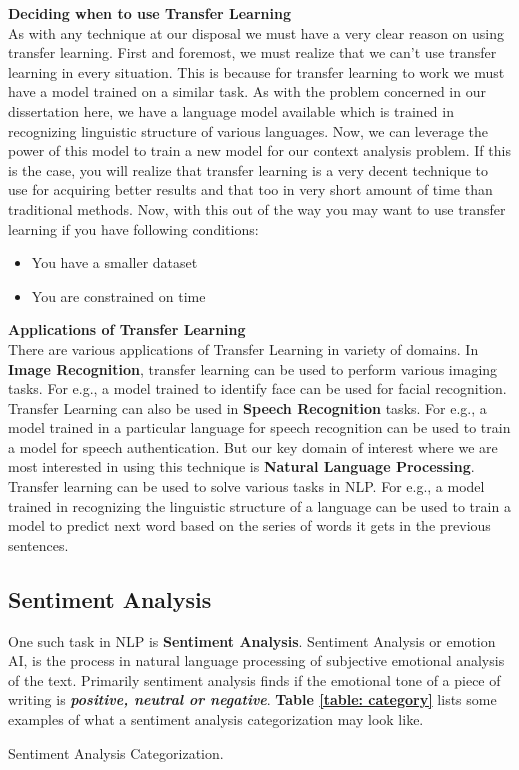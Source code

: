 \documentclass[a4paper, 12pt]{article}
\begin{document}
\begin{sloppypar}
\large \textbf{Deciding when to use Transfer Learning} \\ [0.5ex]
\normalsize
As with any technique at our disposal we must have a very clear reason on using transfer learning. First and foremost, we must realize that we can't use transfer learning in every situation. This is because for transfer learning to work we must have a model trained on a similar task. As with the problem concerned in our dissertation here, we have  a language model available which is trained in recognizing linguistic structure of  various languages. Now, we can leverage the power of this model to train a new model for our
\thispagestyle{empty}
\clearpage
 context analysis problem. If this is the case, you will realize that transfer learning is a very decent technique to use for acquiring better results and that too in very short amount of time than traditional methods. Now, with this out of the way you may want to use transfer learning if you have following conditions:
\begin{itemize}
\item{You have a smaller dataset}
\item{You are constrained on time}
\end{itemize}

\large \textbf{Applications of Transfer Learning} \\ [0.5ex]
\normalsize
There are various applications of Transfer Learning in variety of domains. In \textbf{Image Recognition}, transfer learning can be used to perform various imaging tasks. For e.g.,  a model trained to identify face can be used for facial recognition. Transfer Learning can also be used in \textbf{Speech Recognition} tasks.  For e.g., a model trained in a particular language for speech recognition can be used to train a model for speech authentication. But our key domain of interest where we are most interested in using this technique is \textbf{Natural Language Processing}. Transfer learning can be used to solve various tasks in  NLP. For e.g., a model trained in recognizing the linguistic structure of a language can be used to train a model to predict next word based on the series of words it gets in the previous sentences.

\subsection{Sentiment Analysis}
One such task in NLP is \textbf{Sentiment Analysis}. Sentiment Analysis or emotion AI, is the process in natural language processing  of subjective emotional analysis of the text. Primarily sentiment analysis finds if the emotional tone of a piece of writing is \textbf{\textit{positive, neutral or negative}}. \textbf{Table \ref{table: category}} lists some examples of what a sentiment analysis categorization may look like.
\begin{table}[H]
\caption{ Sentiment Analysis Categorization.\label{table: category}}


\end{table}
\end{sloppypar}
\end{document}
